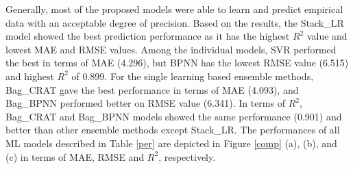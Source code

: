 \documentclass[11pt]{article}
\begin{document}
	
	Generally, most of the proposed models were able to learn and predict empirical data with an acceptable degree of precision. Based on the results, the Stack\_LR model showed the best prediction performance as it has the highest $R^2$ value and lowest MAE and RMSE values. Among the individual models, SVR performed the best in terms of MAE (4.296), but BPNN has the lowest RMSE value (6.515) and highest $R^2$ of 0.899. For the single learning based ensemble methods, Bag\_CRAT gave the best performance in terms of MAE (4.093), and Bag\_BPNN performed better on RMSE value (6.341). In terms of $R^2$, Bag\_CRAT and Bag\_BPNN models showed the same performance (0.901) and better than other ensemble methods except Stack\_LR. The performances of all ML models described in Table \ref{per} are depicted in Figure \ref{comp} (a), (b), and (c) in terms of MAE, RMSE and $R^2$, respectively.
	
	
	
\end{document}
